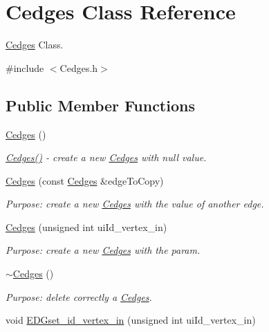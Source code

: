 \hypertarget{class_cedges}{}\section{Cedges Class Reference}
\label{class_cedges}


\hyperlink{class_cedges}{Cedges} Class.  




{\ttfamily \#include $<$Cedges.\+h$>$}

\subsection*{Public Member Functions}
\begin{DoxyCompactItemize}
\item 
\hyperlink{class_cedges_a8a94fa61116c9729559ef86bdb206784}{Cedges} ()
\begin{DoxyCompactList}\small\item\em \hyperlink{class_cedges_a8a94fa61116c9729559ef86bdb206784}{Cedges()} -\/ create a new \hyperlink{class_cedges}{Cedges} with null value. \end{DoxyCompactList}\item 
\hyperlink{class_cedges_ace4e4745e3bc534abf85fc65b0155f1f}{Cedges} (const \hyperlink{class_cedges}{Cedges} \&edge\+To\+Copy)
\begin{DoxyCompactList}\small\item\em Purpose\+: create a new \hyperlink{class_cedges}{Cedges} with the value of another edge. \end{DoxyCompactList}\item 
\hyperlink{class_cedges_a65220863d2f3fb0582d6d0a3b5330ad0}{Cedges} (unsigned int ui\+Id\+\_\+vertex\+\_\+in)
\begin{DoxyCompactList}\small\item\em Purpose\+: create a new \hyperlink{class_cedges}{Cedges} with the param. \end{DoxyCompactList}\item 
\hyperlink{class_cedges_a53e028cb5c5e01c0d5832e13b62d41ec}{$\sim$\+Cedges} ()
\begin{DoxyCompactList}\small\item\em Purpose\+: delete correctly a \hyperlink{class_cedges}{Cedges}. \end{DoxyCompactList}\item 
void \hyperlink{class_cedges_a3a57f7c221ffa2bc787a89efb2aed12c}{E\+D\+Gset\+\_\+id\+\_\+vertex\+\_\+in} (unsigned int ui\+Id\+\_\+vertex\+\_\+in)

\end{DoxyCompactItemize}
